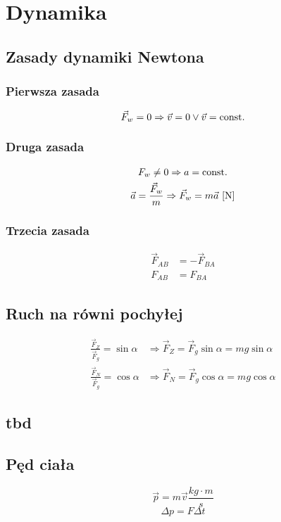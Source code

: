 \chapter{Dynamika}
  \section{Zasady dynamiki Newtona}
    \subsection{Pierwsza zasada}
      \begin{equation}
        \vec F_w = 0 \Rightarrow \vec v = 0 \lor \vec v = \operatorname{const.}
      \end{equation}
    \subsection{Druga zasada}
      \begin{gather}
        F_w \ne 0 \Rightarrow a = \operatorname{const.}\\
        \vec a = \frac{\vec F_w}{m} \Rightarrow \vec F_w = m\vec a \,\left[\mathrm{N}\right]
      \end{gather}
    \subsection{Trzecia zasada}
      \begin{align}
        \vec F_{AB} &= -\vec F_{BA}\\
        F_{AB} &= F_{BA}
      \end{align}
  \section{Ruch na równi pochyłej}
    \begin{align}
      \frac{\vec F_Z}{\vec F_g} = \sin\alpha &\Rightarrow \vec F_Z = \vec F_g\sin\alpha = mg\sin\alpha\\
      \frac{\vec F_N}{\vec F_g} = \cos\alpha &\Rightarrow \vec F_N = \vec F_g\cos\alpha = mg\cos\alpha
    \end{align}
  \section{tbd}
  \section{Pęd ciała}
    \begin{equation}
      \vec p = m\vec v \unit{\frac{kg\cdot m}{s}}
    \end{equation}
    \begin{equation}
      \Delta p = F\Delta t
    \end{equation}
